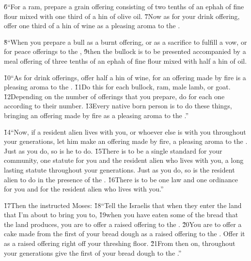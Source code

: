 \v{6}``For a ram, prepare a grain offering consisting of two tenths of an ephah of fine flour mixed with one third of a hin of olive oil. \v{7}Now as for your drink offering, offer one third of a hin of wine as a pleasing aroma to the .

\v{8}``When you prepare a bull as a burnt offering, or as a sacrifice to fulfill a vow, or for peace offerings to the , \v{9}then the bullock is to be presented accompanied by a meal offering of three tenths of an ephah of fine flour mixed with half a hin of oil.

\v{10}``As for drink offerings, offer half a hin of wine, for an offering made by fire is a pleasing aroma to the . \v{11}Do this for each bullock, ram, male lamb, or goat. \v{12}Depending on the number of offerings that you prepare, do for each one according to their number. \v{13}Every native born person is to do these things, bringing an offering made by fire as a pleasing aroma to the .''

\v{14}``Now, if a resident alien lives with you, or whoever else is with you throughout your generations, let him make an offering made by fire, a pleasing aroma to the . Just as you do, so is he to do. \v{15}There is to be a single standard for your community, one statute for you and the resident alien who lives with you, a long lasting statute throughout your generations. Just as you do, so is the resident alien to do in the presence of the . \v{16}There is to be one law and one ordinance for you and for the resident alien who lives with you.''

\v{17}Then the  instructed Moses: \v{18}``Tell the Israelis that when they enter the land that I'm about to bring you to, \v{19}when you have eaten some of the bread that the land produces, you are to offer a raised offering to the . \v{20}You are to offer a cake made from the first of your bread dough as a raised offering to the . Offer it as a raised offering right off your threshing floor. \v{21}From then on, throughout your generations give the first of your bread dough to the .''

